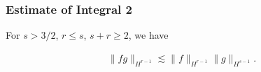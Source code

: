 \documentclass{beamer}
\numberwithin{equation}{section}
\begin{document}
\begin{frame}
\frametitle{Estimate of Integral 2} 







\begin{lemma}
For $s > 3/2$, $r \le s$, $s + r \ge 2$, we have


\begin{equation*}
\begin{split}
  \| fg \|_{H^{r-1}} \lesssim \| f \|_{H^{r-1}} \| g \|_{H^{s-1}}.
\end{split}
\end{equation*}


\label{lem:frac-deriv}
\end{lemma}


\end{frame}
\end{document}
